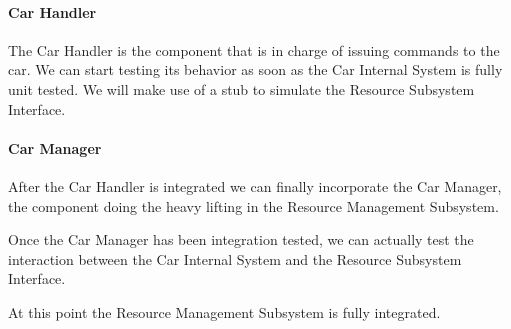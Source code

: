 \documentclass[english]{article}
\begin{document}
\paragraph{Car Handler}
The Car Handler is the component that is in charge of issuing commands to the car. We can start testing its behavior as soon as the Car Internal System is fully unit tested. We will make use of a stub to simulate the Resource Subsystem Interface.

\begin{figure}[H]
	\centering
\end{figure}

\paragraph{Car Manager}
After the Car Handler is integrated we can finally incorporate the Car Manager, the component doing the heavy lifting in the Resource Management Subsystem.
\begin{figure}[H]
	\centering
\end{figure}

Once the Car Manager has been integration tested, we can actually test the interaction between the Car Internal System and the Resource Subsystem Interface.
\begin{figure}[H]
	\centering
\end{figure}

At this point the Resource Management Subsystem is fully integrated.
\begin{figure}[H]
	\centering
\end{figure}
\end{document}
